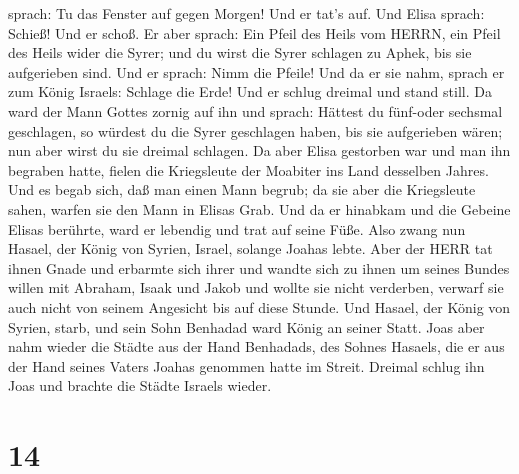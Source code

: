 sprach: Tu das Fenster auf gegen Morgen! Und er tat's auf. Und Elisa
sprach: Schieß! Und er schoß. Er aber sprach: Ein Pfeil des Heils vom
HERRN, ein Pfeil des Heils wider die Syrer; und du wirst die Syrer
schlagen zu Aphek, bis sie aufgerieben sind.  Und er
sprach: Nimm die Pfeile! Und da er sie nahm, sprach er zum König
Israels: Schlage die Erde! Und er schlug dreimal und stand still.
 Da ward der Mann Gottes zornig auf ihn und sprach: Hättest
du fünf-oder sechsmal geschlagen, so würdest du die Syrer geschlagen
haben, bis sie aufgerieben wären; nun aber wirst du sie dreimal
schlagen.  Da aber Elisa gestorben war und man ihn begraben
hatte, fielen die Kriegsleute der Moabiter ins Land desselben Jahres.
 Und es begab sich, daß man einen Mann begrub; da sie aber
die Kriegsleute sahen, warfen sie den Mann in Elisas Grab. Und da er
hinabkam und die Gebeine Elisas berührte, ward er lebendig und trat auf
seine Füße.  Also zwang nun Hasael, der König von Syrien,
Israel, solange Joahas lebte.  Aber der HERR tat ihnen
Gnade und erbarmte sich ihrer und wandte sich zu ihnen um seines Bundes
willen mit Abraham, Isaak und Jakob und wollte sie nicht verderben,
verwarf sie auch nicht von seinem Angesicht bis auf diese Stunde.
 Und Hasael, der König von Syrien, starb, und sein Sohn
Benhadad ward König an seiner Statt.  Joas aber nahm wieder
die Städte aus der Hand Benhadads, des Sohnes Hasaels, die er aus der
Hand seines Vaters Joahas genommen hatte im Streit. Dreimal schlug ihn
Joas und brachte die Städte Israels wieder.

\hypertarget{section-13}{%
\section{14}\label{section-13}}

